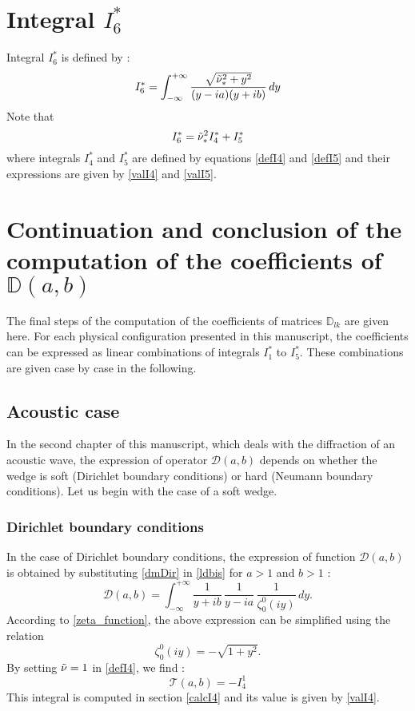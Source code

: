 \section{Integral $I_6^*$}
\label{calcI6}
Integral $I_6^*$ is defined by :
\begin{equation}
I_6^*=\int_{-\infty}^{+\infty}\frac{\sqrt{\tilde{\nu}_*^2+y^2}}{(y-ia)(y+ib)}\,dy
\label{defI6}
\end{equation}
Note that
\begin{equation}
I_6^*=\tilde{\nu}^2_* I_4^*+I_5^*
\end{equation}
where integrals $I_4^*$ and $I_5^*$ are defined by equations \eqref{defI4} and \eqref{defI5} and their expressions are given by \eqref{valI4} and \eqref{valI5}.

\section{Continuation and conclusion of the computation of the coefficients of $\mathbb{D}(a,b)$}
\label{fincalculsD}
The final steps of the computation of the coefficients of matrices $\mathbb{D}_{lk}$ are given here. For each physical configuration presented in this manuscript, the coefficients can be expressed as linear combinations of integrals $I_1^*$ to $I_5^*$. These combinations are given case by case in the following.

\subsection{Acoustic case}
\label{finalDac}
In the second chapter of this manuscript, which deals with the diffraction of an acoustic wave, the expression of operator $\mathcal{D}(a,b)$ depends on whether the wedge is soft (Dirichlet boundary conditions) or hard (Neumann boundary conditions). Let us begin with the case of a soft wedge.  
\subsubsection{Dirichlet boundary conditions}
\label{finalDacDir}
In the case of Dirichlet boundary conditions, the expression of function $\mathcal{D}(a,b)$ is obtained by substituting \eqref{dmDir} in \eqref{ldbis} for $a>1$ and $b>1$ :
\begin{equation}
\mathcal{D}(a,b) = \int_{-\infty}^{+\infty} \dfrac{1}{ y+ib} \, \dfrac{1}{y -i a} \,\dfrac{1}{\zeta_0^0(iy)} \, dy . 
\end{equation}
According to \eqref{zeta_function}, the above expression can be simplified using the relation
\begin{equation}
\zeta_0^0(iy)= - \sqrt{1+y^2}.
\label{Appendix:zeta0iy}
\end{equation}
By setting $\tilde{\nu}=1$ in \eqref{defI4}, we find :
\begin{equation}
\mathcal{T}(a,b)=-I_4^1
\end{equation}
This integral is computed in section \ref{calcI4} and its value is given by \eqref{valI4}.
